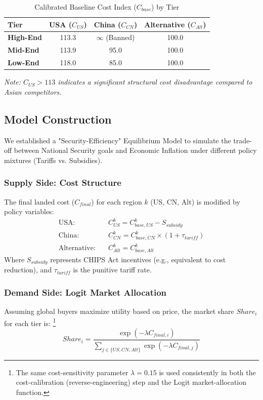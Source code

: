 \documentclass{apmcmthesis}
\begin{document}
\begin{table}[htbp]
    \centering
    \caption{Calibrated Baseline Cost Index ($C_{base}$) by Tier}
    \begin{tabular}{lccc}
        \toprule
        \textbf{Tier} & \textbf{USA ($C_{US}$)} & \textbf{China ($C_{CN}$)} & \textbf{Alternative ($C_{Alt}$)} \\
        \midrule
        \textbf{High-End} & 113.3 & $\infty$ (Banned) & 100.0 \\
        \textbf{Mid-End}  & 113.9 & 95.0 & 100.0 \\
        \textbf{Low-End}  & 118.0 & 85.0 & 100.0 \\
        \bottomrule
    \end{tabular}
    \label{tab:cost_calibration}
\end{table}
\textit{Note: $C_{US} > 113$ indicates a significant structural cost disadvantage compared to Asian competitors.}

\subsection{Model Construction}
We established a "Security-Efficiency" Equilibrium Model to simulate the trade-off between National Security goals and Economic Inflation under different policy mixtures (Tariffs vs. Subsidies).

\subsubsection{Supply Side: Cost Structure}
The final landed cost ($C_{final}$) for each region $k$ (US, CN, Alt) is modified by policy variables:
\begin{align}
    \text{USA:} \quad & C_{US}^k = C_{base, US}^k - S_{subsidy} \\
    \text{China:} \quad & C_{CN}^k = C_{base, CN}^k \times (1 + \tau_{tariff}) \\
    \text{Alternative:} \quad & C_{Alt}^k = C_{base, Alt}^k
\end{align}
Where $S_{subsidy}$ represents CHIPS Act incentives (e.g., equivalent to cost reduction), and $\tau_{tariff}$ is the punitive tariff rate.

\subsubsection{Demand Side: Logit Market Allocation}
Assuming global buyers maximize utility based on price, the market share $Share_i$ for each tier is:
\footnote{The same cost-sensitivity parameter $\lambda=0.15$ is used consistently in both the cost-calibration (reverse-engineering) step and the Logit market-allocation function.}
\begin{equation}
    Share_i = \frac{\exp(-\lambda C_{final, i})}{\sum_{j \in \{US, CN, Alt\}} \exp(-\lambda C_{final, j})}
\end{equation}
\end{document}

